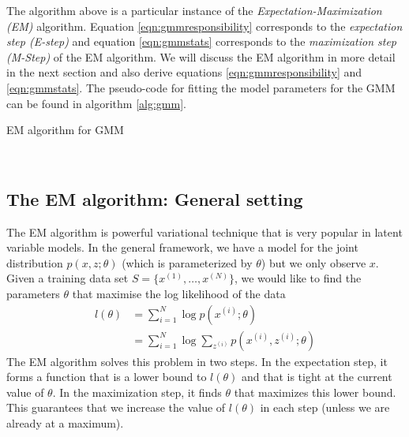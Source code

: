 \documentclass[final,3p,times,twocolumn]{elsarticle}
\begin{document}
The algorithm above is a particular instance of the \emph{Expectation-Maximization (EM)} algorithm.
Equation \ref{eqn:gmmresponsibility} corresponds to the \emph{expectation step (E-step)} and equation \ref{eqn:gmmstats} corresponds to the \emph{maximization step (M-Step)} of the EM algorithm.
We will discuss the EM algorithm in more detail in the next section and also derive equations \ref{eqn:gmmresponsibility} and \ref{eqn:gmmstats}.
The pseudo-code for fitting the model parameters for the GMM can be found in algorithm \ref{alg:gmm}.

\begin{algorithm}
\caption{EM algorithm for GMM}
\label{alg:gmm}
\begin{algorithmic}[1]
\Repeat
{}
\EndFor
{}
\EndFor
{}
\EndProcedure \\
\end{algorithmic}
\end{algorithm}


\subsection{The EM algorithm: General setting}
The EM algorithm is powerful variational technique that is very popular in latent variable models.
In the general framework, we have a model for the joint distribution $p(x,z;\theta)$ (which is parameterized by $\theta$) but we only observe $x$.
Given a training data set $S=\{x^{(1)},\dots,x^{(N)}\}$, we would like to find the parameters $\theta$ that maximise the log likelihood of the data
\begin{equation}
\label{eqn:EMlikelihood}
\begin{split}
l(\theta) &= \sum_{i=1}^N \log p(x^{(i)};\theta)\\
&= \sum_{i=1}^N \log \sum_{z^{(i)}} p(x^{(i)},z^{(i)};\theta)
\end{split}
\end{equation}
The EM algorithm solves this problem in two steps.
In the expectation step, it forms a function that is a lower bound to $l(\theta)$ and that is tight at the current value of $\theta$.
In the maximization step, it finds $\theta$ that maximizes this lower bound.
This guarantees that we increase the value of $l(\theta)$ in each step (unless we are already at a maximum).
\end{document}
